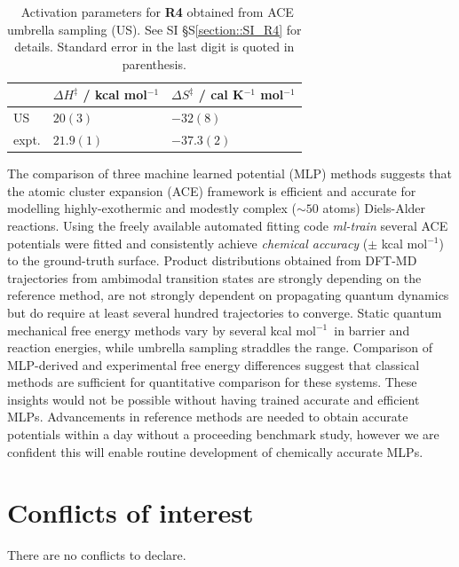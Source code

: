 \documentclass[twoside,twocolumn,9pt]{article}
\newcommand{\kcal}{kcal mol$^{-1}$}
\begin{document}
\begin{table}[h]
	\small
	\caption{\ Activation parameters for {\bfseries{R4}} obtained from ACE umbrella sampling (US). See SI §S\ref{section::SI_R4} for details. Standard error in the last digit is quoted in parenthesis.}
	\label{tbl::X1}
	\vspace{-0.2cm}
	\renewcommand{\arraystretch}{1.4}
	\begin{tabular*}{0.48\textwidth}{@{\extracolsep{\fill}}lll}
		\hline
		 & $\Delta H^\ddagger$ / \kcal & $\Delta S^\ddagger$ / cal K${}^{-1}$ mol$^{-1}$ \\
		\hline
		US & $20(3)$ & $-32(8)$ \\
		expt.\cite{Walsh1975} & $21.9(1)$ & $-37.3(2)$ \\
		\hline
	\end{tabular*}
\end{table}




\vspace{0.2cm}
The comparison of three machine learned potential (MLP) methods suggests that the atomic cluster expansion (ACE) framework is efficient and accurate for modelling highly-exothermic and modestly complex ($\sim 50$ atoms) Diels-Alder reactions. Using the freely available automated fitting code \emph{ml-train}\cite{Young2021mlt} several ACE potentials were fitted and consistently achieve \emph{chemical accuracy} ($\pm$ \kcal) to the ground-truth surface. Product distributions obtained from DFT-MD trajectories from ambimodal transition states are strongly depending on the reference method, are not strongly dependent on propagating quantum dynamics but do require at least several hundred trajectories to converge. Static quantum mechanical free energy methods vary by several \kcal~in barrier and reaction energies, while umbrella sampling straddles the range. Comparison of MLP-derived and experimental free energy differences suggest that classical methods are sufficient for quantitative comparison for these systems. These insights would not be possible without having trained accurate and efficient MLPs. Advancements in reference methods are needed to obtain accurate potentials within a day without a proceeding benchmark study, however we are confident this will enable routine development of chemically accurate MLPs.


\section*{Conflicts of interest}
There are no conflicts to declare.
\end{document}
